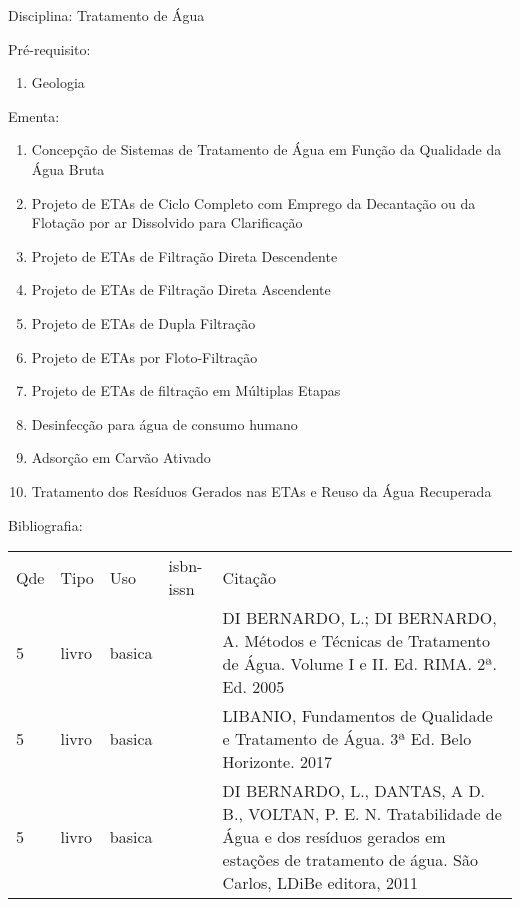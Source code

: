 \documentclass[12pt,a4paper,twoside]{report}
\begin{document}
Disciplina: Tratamento de Água

Pré-requisito:
\begin{enumerate}
\item Geologia
\end{enumerate}

Ementa:
\begin{enumerate}
\item Concepção de Sistemas de Tratamento de Água em Função da Qualidade da Água Bruta
\item Projeto de ETAs de Ciclo Completo com Emprego da Decantação ou da Flotação por ar Dissolvido para Clarificação
\item Projeto de ETAs de Filtração Direta Descendente
\item Projeto de ETAs de Filtração Direta Ascendente
\item Projeto de ETAs de Dupla Filtração
\item Projeto de ETAs por Floto-Filtração
\item Projeto de ETAs de filtração em Múltiplas Etapas
\item Desinfecção para água de consumo humano
\item Adsorção em Carvão Ativado
\item Tratamento dos Resíduos Gerados nas ETAs e Reuso da Água Recuperada
\end{enumerate}

Bibliografia:
\begin{tabular}{lllll}
Qde & Tipo & Uso & isbn-issn & Citação \\
5&livro&basica&&DI BERNARDO, L.; DI BERNARDO, A. Métodos e Técnicas de Tratamento de Água. Volume I e II. Ed. RIMA. 2ª. Ed. 2005\\
5&livro&basica&&LIBANIO, Fundamentos de Qualidade e Tratamento de Água. 3ª Ed. Belo Horizonte. 2017\\
5&livro&basica&&DI BERNARDO, L., DANTAS, A D. B., VOLTAN, P. E. N. Tratabilidade de Água e dos resíduos gerados em estações de tratamento de água. São Carlos, LDiBe editora, 2011\\
\end{tabular}
\end{document}
